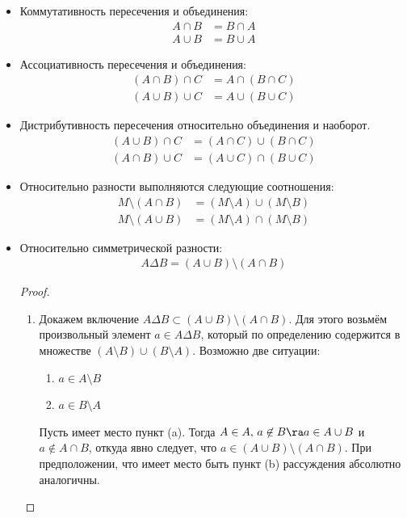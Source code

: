 \begin{itemize}
	\item Коммутативность пересечения и объединения:
		\begin{align*}
			A\cap B&=B\cap A \\
			A\cup B&=B\cup A
		\end{align*}
	\item Ассоциативность пересечения и объединения:
		\begin{align*}
			(A\cap B)\cap C&=A\cap(B\cap C) \\
			(A\cup B)\cup C&=A\cup(B\cup C)
		\end{align*}
	\item Дистрибутивность пересечения относительно объединения и наоборот.
		\begin{align*}
			(A\cup B)\cap C&=(A\cap C)\cup(B\cap C) \\
			(A\cap B)\cup C&=(A\cup C)\cap(B\cup C)
		\end{align*}
	\item Относительно разности выполняются следующие соотношения:
		\begin{align*}
			M\setminus(A\cap B)&=(M\setminus A)\cup(M\setminus B) \\
			M\setminus(A\cup B)&=(M\setminus A)\cap(M\setminus B)
		\end{align*}
	\item Относительно симметрической разности:
          \begin{align*}
            A\Delta B = (A\cup B)\setminus (A\cap B)
          \end{align*}
    \begin{proof}
    \begin{enumerate}
      \item Докажем включение $A\Delta B \subset (A\cup B)\setminus (A\cap B)$.
        Для этого возьмём произвольный элемент $a\in A\Delta B$,
        который по определению содержится в множестве $(A\setminus B)\cup(B\setminus A)$.
        Возможно две ситуации:
        \begin{enumerate}
          \item $a\in A\setminus B$
          \item $a\in B\setminus A$
        \end{enumerate}
        Пусть имеет место пункт (a).
        Тогда $A\in A,\, a\not\in B\ra a \in A\cup B$ и $a\not\in A\cap B$, откуда явно следует,
        что $a\in(A\cup B)\setminus (A\cap B)$. При предположении, что имеет место быть
        пункт (b) рассуждения абсолютно аналогичны.


\end{enumerate}
\end{proof}
\end{itemize}
